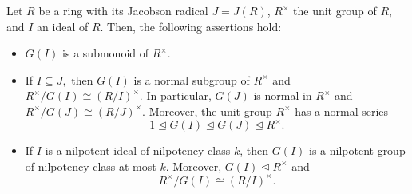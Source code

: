 \documentclass[10pt,a4paper]{amsart}
\begin{document}
\begin{lemma}\label{lem:5.1} Let $R$ be a ring with its Jacobson radical $J=J(R)$, $R^\times$ the unit group of $R$, and $I$ an ideal of $R$. Then, the following assertions hold:
\begin{itemize}
\item [(1)] $G(I)$ is a submonoid of $R^\times.$
\item [(2)] If $I\subseteq J,$ then $G(I)$ is a normal subgroup of $R^\times$ and $R^\times/G(I)\cong (R/I)^\times.$ In particular, $G(J)$ is normal in $R^\times$ and $R^\times/G(J)\cong (R/J)^\times.$ Moreover, the unit group $R^\times$ has a normal series $$1\trianglelefteq G(I)\trianglelefteq G(J)\trianglelefteq R^\times.$$
\item [(3)] If $I$ is a nilpotent ideal of nilpotency class $k$, then $G(I)$ is a nilpotent group of nilpotency class at most $k.$ Moreover, $G(I)\trianglelefteq R^\times$ and $$R^\times/G(I)\cong (R/I)^\times.$$
\end{itemize}	
\end{lemma} 
\end{document}
